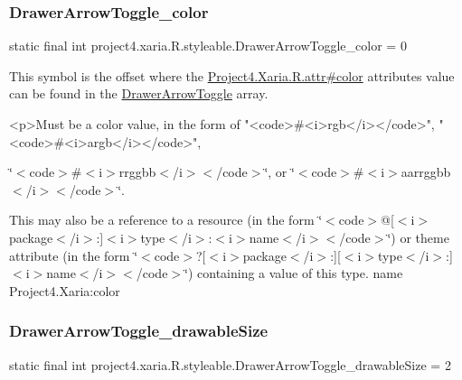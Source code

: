 \subsubsection{\texorpdfstring{Drawer\+Arrow\+Toggle\+\_\+color}{DrawerArrowToggle\_color}}
{\footnotesize\ttfamily static final int project4.\+xaria.\+R.\+styleable.\+Drawer\+Arrow\+Toggle\+\_\+color = 0\hspace{0.3cm}{\ttfamily [static]}}

This symbol is the offset where the \hyperlink{}{Project4.\+Xaria.\+R.\+attr\#color} attribute\textquotesingle{}s value can be found in the \hyperlink{classproject4_1_1xaria_1_1R_1_1styleable_aa8594da8de0b2617c3d5cd5e028f8b77}{Drawer\+Arrow\+Toggle} array.

\begin{DoxyVerb}      <p>Must be a color value, in the form of "<code>#<i>rgb</i></code>", "<code>#<i>argb</i></code>",
\end{DoxyVerb}
 \char`\"{}$<$code$>$\#$<$i$>$rrggbb$<$/i$>$$<$/code$>$\char`\"{}, or \char`\"{}$<$code$>$\#$<$i$>$aarrggbb$<$/i$>$$<$/code$>$\char`\"{}. 

This may also be a reference to a resource (in the form \char`\"{}$<$code$>$@\mbox{[}$<$i$>$package$<$/i$>$\+:\mbox{]}$<$i$>$type$<$/i$>$\+:$<$i$>$name$<$/i$>$$<$/code$>$\char`\"{}) or theme attribute (in the form \char`\"{}$<$code$>$?\mbox{[}$<$i$>$package$<$/i$>$\+:\mbox{]}\mbox{[}$<$i$>$type$<$/i$>$\+:\mbox{]}$<$i$>$name$<$/i$>$$<$/code$>$\char`\"{}) containing a value of this type.  name Project4.\+Xaria\+:color \mbox{\label{classproject4_1_1xaria_1_1R_1_1styleable_a9c3f73891dd5a4d60247e34fefb8c47a}} 
\subsubsection{\texorpdfstring{Drawer\+Arrow\+Toggle\+\_\+drawable\+Size}{DrawerArrowToggle\_drawableSize}}
{\footnotesize\ttfamily static final int project4.\+xaria.\+R.\+styleable.\+Drawer\+Arrow\+Toggle\+\_\+drawable\+Size = 2\hspace{0.3cm}{\ttfamily [static]}}

